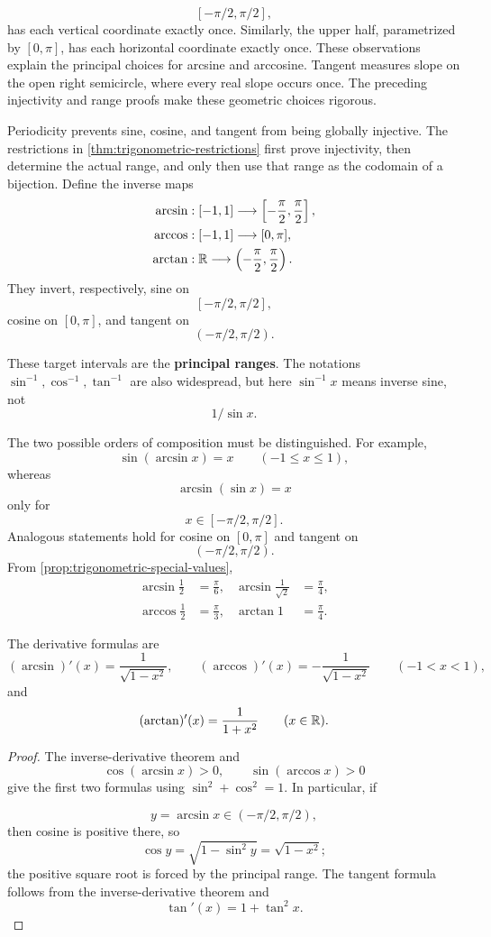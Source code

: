 \[
[-\pi/2,\pi/2],
\]
 has each vertical coordinate exactly once. Similarly,
the upper half, parametrized by $[0,\pi]$, has each horizontal coordinate
exactly once. These observations explain the principal choices for arcsine
and arccosine. Tangent measures slope on the open right semicircle, where
every real slope occurs once. The preceding injectivity and range proofs
make these geometric choices rigorous.

\begin{definition}
\label{def:inverse-trigonometric}
Periodicity prevents sine, cosine, and tangent from being globally
injective. The restrictions in \cref{thm:trigonometric-restrictions} first
prove injectivity, then determine the actual range, and only then use that
range as the codomain of a bijection. Define the inverse maps
\[
\begin{aligned}
\arcsin &: [-1,1]\longrightarrow\left[-\frac\pi2,\frac\pi2\right],\\
\arccos &: [-1,1]\longrightarrow[0,\pi],\\
\arctan &: \mathbb{R}\longrightarrow\left(-\frac\pi2,\frac\pi2\right).
\end{aligned}
\]
They invert, respectively, sine on
\[
[-\pi/2,\pi/2],
\]
 cosine on $[0,\pi]$,
and tangent on
\[
(-\pi/2,\pi/2).
\]

These target intervals are the \textbf{principal ranges}. The notations
\(\sin^{-1},\cos^{-1},\tan^{-1}\) are also widespread, but here
\(\sin^{-1}x\) means inverse sine, not
\[
1/\sin x.
\]

\end{definition}

The two possible orders of composition must be distinguished. For example,
\[
\sin(\arcsin x)=x\qquad(-1\leq x\leq1),
\]
whereas
\[
\arcsin(\sin x)=x
\]
only for
\[
x\in[-\pi/2,\pi/2].
\]
 Analogous statements hold for cosine
on \([0,\pi]\) and tangent on
\[
(-\pi/2,\pi/2).
\]
 From
\cref{prop:trigonometric-special-values},
\[
\begin{aligned}
\arcsin\frac12&=\frac\pi6,&\arcsin\frac1{\sqrt2}&=\frac\pi4,\\
\arccos\frac12&=\frac\pi3,&\arctan1&=\frac\pi4.
\end{aligned}
\]

\begin{theorem}
\label{thm:inverse-trigonometric}
The derivative formulas are
\[
(\arcsin)'(x)=\frac{1}{\sqrt{1-x^2}},
\qquad
(\arccos)'(x)=-\frac{1}{\sqrt{1-x^2}}
\qquad(-1<x<1),
\]
and
\[
(\arctan)'(x)=\frac{1}{1+x^2}
\qquad(x\in\mathbb{R}).
\]
\end{theorem}
\begin{proof}
The inverse-derivative theorem and
\[
\cos(\arcsin x)>0,\qquad
\sin(\arccos x)>0
\]
give the first two formulas using $\sin^2+\cos^2=1$. In particular, if

\[
y=\arcsin x\in(-\pi/2,\pi/2),
\]
 then cosine is positive there, so
\[
\cos y=\sqrt{1-\sin^2y}=\sqrt{1-x^2};
\]
the positive square root is forced by the principal range. The tangent formula follows from the inverse-derivative theorem and
\[
\tan'(x)=1+\tan^2x.
\]
\end{proof}


